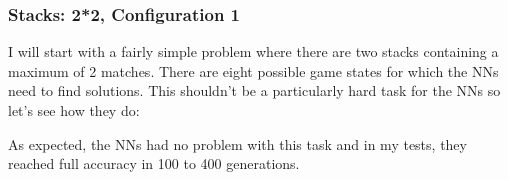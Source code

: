 \documentclass[11pt]{report}
\begin{document}
\begin{enumerate}
    \subsubsection{Stacks: 2*2, Configuration 1}
    I will start with a fairly simple problem where there are two stacks containing a maximum of 2 matches.
    There are eight possible game states for which the NNs need to find solutions.
    This shouldn't be a particularly hard task for the NNs so let's see how they do:
    \renewcommand{\csvpath}{../data/nim/stacks_2x2/t_1.2/stats.csv} %
    \begin{center}
    \end{center}
    As expected, the NNs had no problem with this task and in my tests, they reached full accuracy in 100 to 400 generations.


\end{enumerate}
\end{document}
